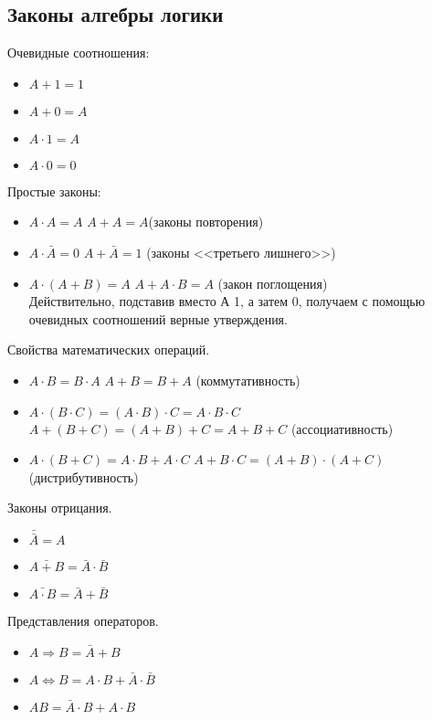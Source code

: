 \subsection*{Законы алгебры логики}
Очевидные соотношения:
\begin{itemize}
	\item $A+1 = 1$
	\item $A+0=A$
	\item $A\cdot1=A$
	\item $A\cdot0=0$
\end{itemize}
Простые законы:
\begin{itemize}
	\item $A\cdot A = A$ \qquad $ A + A = A$(законы повторения)
	\item $A\cdot\bar{A}=0$ \qquad $A + \bar{A} = 1$ (законы <<третьего лишнего>>)
	\item $A\cdot(A+B)=A$ $A+A\cdot B=A$ (закон поглощения)\\
	Действительно, подставив вместо А 1, а затем 0, получаем с помощью очевидных соотношений верные утверждения.
\end{itemize}

Свойства математических операций.
\begin{itemize}
	\item $A\cdot B=B\cdot A$ \qquad $A+B=B+A$ (коммутативность)
	\item $A\cdot(B\cdot C)= (A\cdot B)\cdot C = A\cdot B\cdot C$ \qquad $A+(B+C)=(A+B)+C=A+B+C$ (ассоциативность)
	\item $A\cdot(B+C)=A\cdot B+A\cdot C$ \qquad $A+B\cdot C = (A+B)\cdot(A+C)$  (дистрибутивность)
\end{itemize}

Законы отрицания.
\begin{itemize}
	\item $\bar{\bar{A}}=A$
	\item $\bar{A+B}=\bar{A}\cdot\bar{B}$
	\item $\bar{A\cdot B}=\bar{A}+\bar{B}$
\end{itemize}

Представления операторов.
\begin{itemize}
	\item $A \Rightarrow B = \bar{A} + B$
	\item $A \Leftrightarrow B = A\cdot B + \bar{A}\cdot \bar{B}$
	\item $A B = \bar{A}\cdot B + A\cdot B$
\end{itemize}

